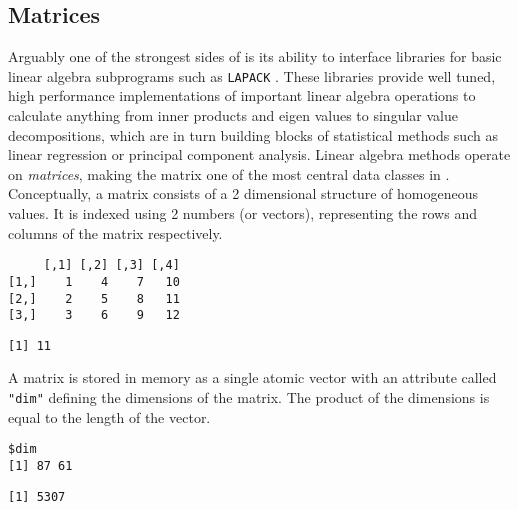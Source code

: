 \subsection{Matrices}

Arguably one of the strongest sides of \R is its ability to interface libraries for basic linear algebra subprograms \citep{lawson1979basic} such as \texttt{LAPACK} \citep{anderson1999lapack}. These libraries provide well tuned, high performance implementations of important linear algebra operations to calculate anything from inner products and eigen values to singular value decompositions, which are in turn building blocks of statistical methods such as linear regression or principal component analysis. Linear algebra methods operate on \emph{matrices}, making the matrix one of the most central data classes in \R. Conceptually, a matrix consists of a 2 dimensional structure of homogeneous values. It is indexed using 2 numbers (or vectors), representing the rows and columns of the matrix respectively. 

\begin{knitrout}\mycodesize
{}\color{fgcolor}\begin{kframe}
\begin{alltt}
 \hlkwb{<-} \hlstd{(}\hlopt{:}\hlstd{,}  \hlstd{=} \hlstd{,}  \hlstd{=} \hlstd{)}
\end{alltt}
\begin{verbatim}
     [,1] [,2] [,3] [,4]
[1,]    1    4    7   10
[2,]    2    5    8   11
[3,]    3    6    9   12
\end{verbatim}
\begin{alltt}
\hlstd{(x[}\hlstd{,} \hlstd{])}
\end{alltt}
\begin{verbatim}
[1] 11
\end{verbatim}
\end{kframe}
\end{knitrout}


 A matrix is stored in memory as a single atomic vector with an attribute called \texttt{"dim"} defining the dimensions of the matrix. The product of the dimensions is equal to the length of the vector. 

\begin{knitrout}\mycodesize
{}\color{fgcolor}\begin{kframe}
\begin{alltt}
\end{alltt}
\begin{verbatim}
$dim
[1] 87 61
\end{verbatim}
\begin{alltt}
\end{alltt}
\begin{verbatim}
[1] 5307
\end{verbatim}
\end{kframe}
\end{knitrout}


